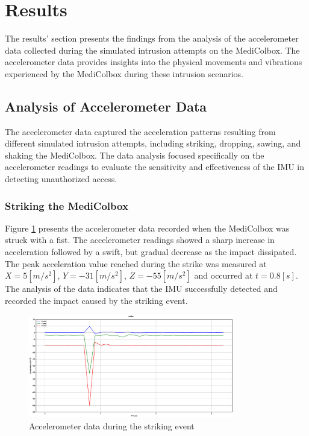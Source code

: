 \documentclass[../main.tex]{subfiles}
\begin{document}
\section{Results}
The results' section presents the findings from the analysis of the accelerometer data collected during the simulated intrusion attempts on the MediColbox. The accelerometer data provides insights into the physical movements and vibrations experienced by the MediColbox during these intrusion scenarios.

\subsection{Analysis of Accelerometer Data}

The accelerometer data captured the acceleration patterns resulting from different simulated intrusion attempts, including striking, dropping, sawing, and shaking the MediColbox.
The data analysis focused specifically on the accelerometer readings to evaluate the sensitivity and effectiveness of the IMU in detecting unauthorized access.

\clearpage

\subsubsection{Striking the MediColbox}

Figure \ref{fig:accelerometer_striking} presents the
accelerometer data recorded when the MediColbox was
struck with a fist.
The accelerometer readings showed a sharp increase in
acceleration followed by a swift, but gradual decrease as
the impact dissipated.
The peak acceleration value reached during the
strike was measured at
$X = 5 [m/s^2]$, $Y = -31 [m/s^2]$, $Z = -55 [m/s^2]$
and occurred at $t = 0.8[s]$.
The analysis of the data indicates that the
IMU successfully detected and recorded the impact caused by the
striking event.

\begin{figure}[htbp]
    \centering
    \includegraphics[width=0.8\textwidth]{resources/figures/Acceleration_strike.eps}
    \caption{Accelerometer data during the striking event}
    \label{fig:accelerometer_striking}
\end{figure}
\end{document}
